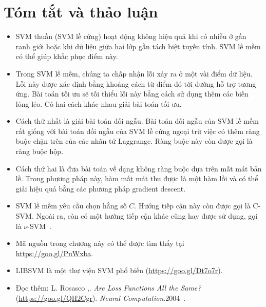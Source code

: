  
\section{Tóm tắt và thảo luận }
\begin{itemize}
    \item SVM thuần (SVM lề cứng) hoạt động không hiệu quả khi có nhiễu
    ở gần ranh giới hoặc khi dữ liệu giữa hai lớp gần tách biệt tuyến tính. SVM lề mềm có thể giúp khắc phục điểm này.  
     
    \item Trong SVM lề mềm, chúng ta chấp nhận lỗi xảy ra ở
    một
    vài điểm dữ liệu. Lỗi này được xác định bằng khoảng cách từ điểm đó tới
    đường hỗ trợ tương ứng. Bài toán tối ưu sẽ tối thiểu lỗi này bằng
    cách sử dụng thêm các biến lỏng lẻo. Có hai cách khác nhau giải bài toán tối ưu. 
     
    \item Cách thứ nhất là giải bài toán đối ngẫu. Bài toán đối ngẫu của
    SVM lề mềm rất giống với bài toán đối ngẫu của SVM lề cứng ngoại trừ việc có thêm ràng buộc chặn trên của các nhân tử Laggrange. Ràng buộc này còn được gọi là ràng buộc hộp. 
     
    \item Cách thứ hai là đưa bài toán về dạng không ràng buộc dựa trên mất mát bản lề. Trong phương pháp này, hàm mất mát thu được là một
    hàm lồi và có thể giải hiệu quả bằng các phương pháp gradient    descent.  
     
    \item SVM lề mềm yêu cầu chọn hằng số $C$. Hướng tiếp cận này còn được gọi là C-SVM. Ngoài ra, còn có một hướng tiếp cận khác cũng hay được sử dụng, gọi là
    $\nu$-SVM~\cite{scholkopf2000new}. 
     
    \item Mã nguồn trong chương này có thể được tìm thấy tại
    \url{https://goo.gl/PuWxba}. 
    
    \item LIBSVM là một thư viện SVM phổ biến  (\url{https://goo.gl/Dt7o7r}).
     
    \item {Đọc thêm:} L. Rosasco \etal,.
    {\textit{Are Loss
        Functions All the Same?}} (\url{https://goo.gl/QH2Cgr}). \textit{Neural
    Computation}.2004~\cite{rosasco2004loss}.
 \end{itemize} 
